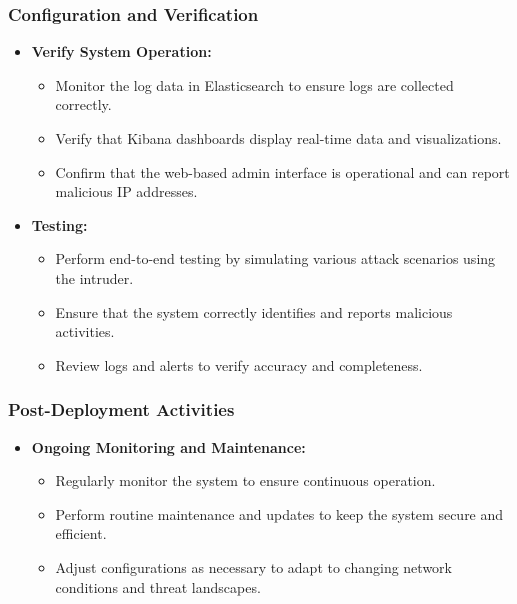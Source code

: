 \documentclass{article}
\begin{document}
    \subsubsection{Configuration and Verification}\label{subsubsec:config-verification}
    \begin{itemize}
        \item \textbf{Verify System Operation:}
        \begin{itemize}
            \item Monitor the log data in Elasticsearch to ensure logs are collected correctly.
            \item Verify that Kibana dashboards display real-time data and visualizations.
            \item Confirm that the web-based admin interface is operational and can report malicious IP addresses.
        \end{itemize}

        \item \textbf{Testing:}
        \begin{itemize}
            \item Perform end-to-end testing by simulating various attack scenarios using the intruder.
            \item Ensure that the system correctly identifies and reports malicious activities.
            \item Review logs and alerts to verify accuracy and completeness.
        \end{itemize}
    \end{itemize}

    \subsubsection{Post-Deployment Activities}\label{subsubsec:post-deployment}
    \begin{itemize}
        \item \textbf{Ongoing Monitoring and Maintenance:}
        \begin{itemize}
            \item Regularly monitor the system to ensure continuous operation.
            \item Perform routine maintenance and updates to keep the system secure and efficient.
            \item Adjust configurations as necessary to adapt to changing network conditions and threat landscapes.
        \end{itemize}
    \end{itemize}
\end{document}
